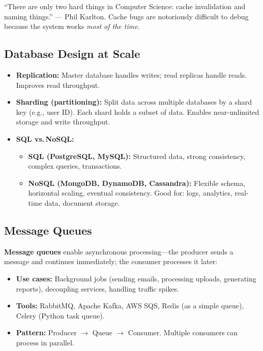\documentclass[12pt, a4paper, oneside]{book}
\begin{document}
\begin{warningbox}
``There are only two hard things in Computer Science: cache invalidation and naming things.'' --- Phil Karlton. Cache bugs are notoriously difficult to debug because the system works \emph{most of the time}.
\end{warningbox}

\subsection{Database Design at Scale}

\begin{itemize}[leftmargin=2em]
    \item \textbf{Replication:} Master database handles writes; read replicas handle reads. Improves read throughput.
    \item \textbf{Sharding (partitioning):} Split data across multiple databases by a shard key (e.g., user ID). Each shard holds a subset of data. Enables near-unlimited storage and write throughput.
    \item \textbf{SQL vs.\,NoSQL:}
    \begin{itemize}
        \item \textbf{SQL (PostgreSQL, MySQL):} Structured data, strong consistency, complex queries, transactions.
        \item \textbf{NoSQL (MongoDB, DynamoDB, Cassandra):} Flexible schema, horizontal scaling, eventual consistency. Good for: logs, analytics, real-time data, document storage.
    \end{itemize}
\end{itemize}

\subsection{Message Queues}

\textbf{Message queues} enable asynchronous processing---the producer sends a message and continues immediately; the consumer processes it later:

\begin{itemize}[leftmargin=2em]
    \item \textbf{Use cases:} Background jobs (sending emails, processing uploads, generating reports), decoupling services, handling traffic spikes.
    \item \textbf{Tools:} RabbitMQ, Apache Kafka, AWS SQS, Redis (as a simple queue), Celery (Python task queue).
    \item \textbf{Pattern:} Producer $\to$ Queue $\to$ Consumer. Multiple consumers can process in parallel.
\end{itemize}
\end{document}
